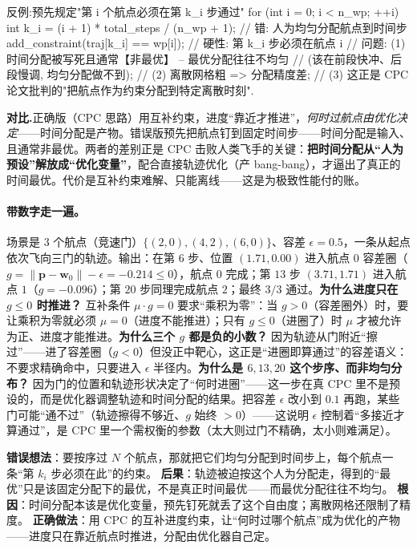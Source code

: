 \begin{codebox}[C++]{反例:预先规定"第 i 个航点必须在第 k\_i 步通过"}
for (int i = 0; i < n_wp; ++i) {
  int k_i = (i + 1) * total_steps / (n_wp + 1);  // 错: 人为均匀分配航点到时间步
  add_constraint(traj[k_i] == wp[i]);             // 硬性: 第 k_i 步必须在航点 i
}
// 问题: (1) 时间分配被写死且通常【非最优】 -- 最优分配往往不均匀
//           (该在前段快冲、后段慢调, 均匀分配做不到);
//       (2) 离散网格粗 => 分配精度差;
//       (3) 这正是 CPC 论文批判的"把航点作为约束分配到特定离散时刻".
\end{codebox}

\noindent\textbf{对比.}\;正确版（CPC 思路）用互补约束，进度“靠近才推进”，\emph{何时过航点由优化决定}——时间分配是产物。错误版预先把航点钉到固定时间步——时间分配是输入、且通常非最优。两者的差别正是 CPC 击败人类飞手的关键：\textbf{把时间分配从“人为预设”解放成“优化变量”}，配合直接轨迹优化（产 bang-bang），才逼出了真正的时间最优。代价是互补约束难解、只能离线——这是为极致性能付的账。

\paragraph{带数字走一遍。}
场景是 $3$ 个航点（竞速门）$\{(2,0),(4,2),(6,0)\}$、容差 $\epsilon=0.5$，一条从起点依次飞向三门的轨迹。输出：在第 $6$ 步、位置 $(1.71,0.00)$ 进入航点 $0$ 容差圈（$g=\|\mathbf p-\mathbf w_0\|-\epsilon=-0.214\le 0$），航点 $0$ 完成；第 $13$ 步 $(3.71,1.71)$ 进入航点 $1$（$g=-0.096$）；第 $20$ 步同理完成航点 $2$；最终 $3/3$ 通过。\textbf{为什么进度只在 $g\le 0$ 时推进？} 互补条件 $\mu\cdot g=0$ 要求“乘积为零”：当 $g>0$（容差圈外）时，要让乘积为零就必须 $\mu=0$（进度不能推进）；只有 $g\le 0$（进圈了）时 $\mu$ 才被允许为正、进度才能推进。\textbf{为什么三个 $g$ 都是负的小数？} 因为轨迹从门附近“擦过”——进了容差圈（$g<0$）但没正中靶心，这正是“进圈即算通过”的容差语义：不要求精确命中，只要进入 $\epsilon$ 半径内。\textbf{为什么是 $6,13,20$ 这个步序、而非均匀分布？} 因为门的位置和轨迹形状决定了“何时进圈”——这一步在真 CPC 里不是预设的，而是优化器调整轨迹和时间分配的结果。把容差 $\epsilon$ 改小到 $0.1$ 再跑，某些门可能“通不过”（轨迹擦得不够近、$g$ 始终 $>0$）——这说明 $\epsilon$ 控制着“多接近才算通过”，是 CPC 里一个需权衡的参数（太大则过门不精确，太小则难满足）。

\begin{pitfall}
\textbf{错误想法}：要按序过 $N$ 个航点，那就把它们均匀分配到时间步上，每个航点一条“第 $k_i$ 步必须在此”的约束。\;
\textbf{后果}：轨迹被迫按这个人为分配走，得到的“最优”只是该固定分配下的最优，不是真正时间最优——而最优分配往往不均匀。\;
\textbf{根因}：时间分配本该是优化变量，预先钉死就丢了这个自由度；离散网格还限制了精度。\;
\textbf{正确做法}：用 CPC 的互补进度约束，让“何时过哪个航点”成为优化的产物——进度只在靠近航点时推进，分配由优化器自己定。
\end{pitfall}

